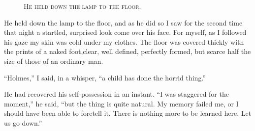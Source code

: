 \documentclass[12pt,english,oneside]{book}
\newcommand{\noun}[1]{\textsc{#1}}
\begin{document}
%
\begin{figure}[htbp]
\noindent {}

\noindent \begin{center}\noun{He held down the lamp to the floor.}\end{center}
\end{figure}
He held down the lamp to the floor, and as he did so I saw for the
second time that night a startled, surprised look come over his face.
For myself, as I followed his gaze my skin was cold under my clothes.
The floor was covered thickly with the prints of a naked foot,\mdsh{---}clear,
well defined, perfectly formed, but scarce half the size of those
of an ordinary man.

{}``Holmes,'' I said, in a whisper, {}``a child has done the horrid
thing.''

He had recovered his self-possession in an instant. {}``I was staggered
for the moment,'' he said, {}``but the thing is quite natural. My
memory failed me, or I should have been able to foretell it. There
is nothing more to be learned here. Let us go down.''
\end{document}
